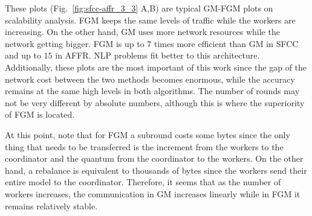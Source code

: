 \newpage

These plots (Fig.~\ref{fig:sfcc-affr_3_3} A,B) are typical GM-FGM plots on scalability analysis.
FGM keeps the same levels of traffic while the workers are increasing.
On the other hand, GM uses more network resources while the network getting bigger.
FGM is up to $7$ times more efficient than GM in SFCC and up to $15$ in AFFR\@.
NLP problems fit better to this architecture.
Additionally, these plots are the most important of this work since the gap of the network cost between the two methods becomes enormous, while the accuracy remains at the same high levels in both algorithms.
The number of rounds may not be very different by absolute numbers, although this is where the superiority of FGM is located.

At this point, note that for FGM a subround costs some bytes since the only thing that needs to be transferred is the increment from the workers to the coordinator and the quantum from the coordinator to the workers.
On the other hand, a rebalance is equivalent to thousands of bytes since the workers send their entire model to the coordinator.
Therefore, it seems that as the number of workers increases, the communication in GM increases linearly while in FGM it remains relatively stable.


